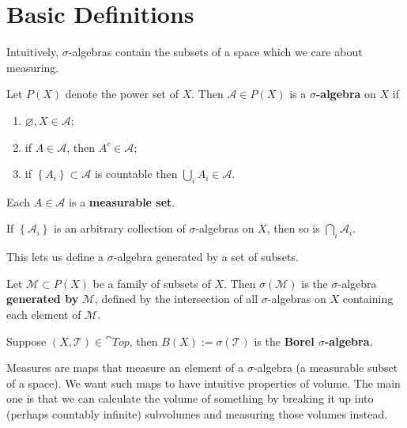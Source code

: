 \documentclass[twoside,10pt]{article}
\begin{document}
\tableofcontents


\section{Basic Definitions}

Intuitively, $\sigma$-algebras contain the subsets of a space which we care about measuring.

\begin{defn}[]
Let $P(X)$ denote the power set of $X$. Then $\mathcal{A} \in P(X)$ is a $\sigma$\textbf{-algebra} on $X$ if
\begin{enumerate}
	\item $\varnothing, X \in \mathcal{A}$;
	\item if $A \in \mathcal{A}$, then $A^{c} \in \mathcal{A}$;
	\item if $\left\{ A_{i} \right\} \subset \mathcal{A}$ is countable then $\bigcup_{i}A_{i} \in \mathcal{A}$.
\end{enumerate}
Each $A \in \mathcal{A}$ is a \textbf{measurable set}.
\end{defn}

\begin{prop}
If $\left\{ \mathcal{A}_i \right\}$ is an arbitrary collection of $\sigma$-algebras on $X$, then so is $\bigcap_{i}\mathcal{A}_{i}$.
\end{prop}

This lets us define a $\sigma$-algebra generated by a set of subsets.

\begin{defn}[]
Let $\mathcal{M} \subset P(X)$ be a family of subsets of $X$. Then $\sigma(\mathcal{M})$ is the $\sigma$-algebra \textbf{generated by} $\mathcal{M}$, defined by the intersection of all $\sigma$-algebras on $X$ containing each element of $\mathcal{M}$.
\end{defn}

\begin{ex}[]
Suppose $(X,\mathcal{T}) \in \cat{Top}$, then $B(X) := \sigma(\mathcal{T})$ is the \textbf{Borel $\sigma$-algebra}.
\end{ex}

Measures are maps that measure an element of a $\sigma$-algebra (a measurable subset of a space). We want such maps to have intuitive properties of volume. The main one is that we can calculate the volume of something by breaking it up into (perhaps countably infinite) subvolumes and measuring those volumes instead.
\end{document}
